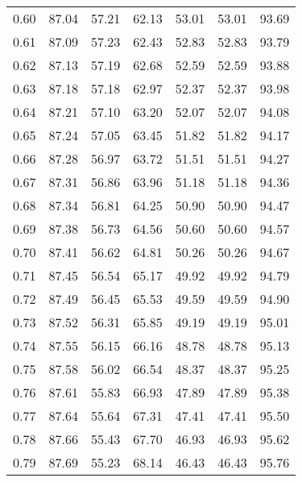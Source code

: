 \begin{tabular}{|c|c|c|c|c|c|c|}
      0.60 &     87.04 &     57.21 &      62.13 &   53.01 &      53.01 &         93.69 \\
      0.61 &     87.09 &     57.23 &      62.43 &   52.83 &      52.83 &         93.79 \\
      0.62 &     87.13 &     57.19 &      62.68 &   52.59 &      52.59 &         93.88 \\
      0.63 &     87.18 &     57.18 &      62.97 &   52.37 &      52.37 &         93.98 \\
      0.64 &     87.21 &     57.10 &      63.20 &   52.07 &      52.07 &         94.08 \\
      0.65 &     87.24 &     57.05 &      63.45 &   51.82 &      51.82 &         94.17 \\
      0.66 &     87.28 &     56.97 &      63.72 &   51.51 &      51.51 &         94.27 \\
      0.67 &     87.31 &     56.86 &      63.96 &   51.18 &      51.18 &         94.36 \\
      0.68 &     87.34 &     56.81 &      64.25 &   50.90 &      50.90 &         94.47 \\
      0.69 &     87.38 &     56.73 &      64.56 &   50.60 &      50.60 &         94.57 \\
      0.70 &     87.41 &     56.62 &      64.81 &   50.26 &      50.26 &         94.67 \\
      0.71 &     87.45 &     56.54 &      65.17 &   49.92 &      49.92 &         94.79 \\
      0.72 &     87.49 &     56.45 &      65.53 &   49.59 &      49.59 &         94.90 \\
      0.73 &     87.52 &     56.31 &      65.85 &   49.19 &      49.19 &         95.01 \\
      0.74 &     87.55 &     56.15 &      66.16 &   48.78 &      48.78 &         95.13 \\
      0.75 &     87.58 &     56.02 &      66.54 &   48.37 &      48.37 &         95.25 \\
      0.76 &     87.61 &     55.83 &      66.93 &   47.89 &      47.89 &         95.38 \\
      0.77 &     87.64 &     55.64 &      67.31 &   47.41 &      47.41 &         95.50 \\
      0.78 &     87.66 &     55.43 &      67.70 &   46.93 &      46.93 &         95.62 \\
      0.79 &     87.69 &     55.23 &      68.14 &   46.43 &      46.43 &         95.76 \\

\end{tabular}
